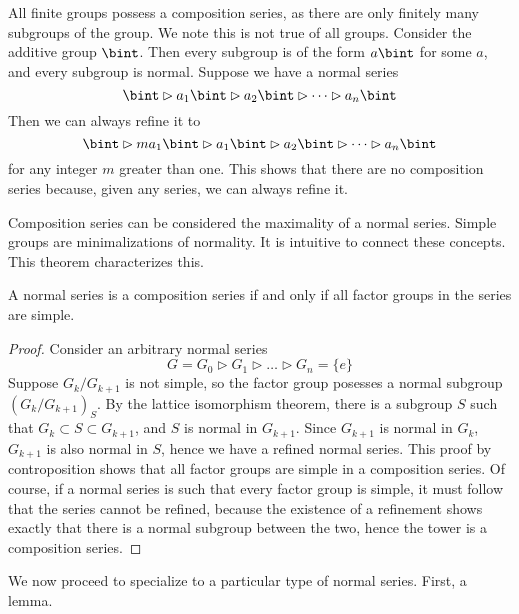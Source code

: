 All finite groups possess a composition series, as there are only finitely many subgroups of the group. We note this is not true of all groups. Consider the additive group $\bint$. Then every subgroup is of the form $a\bint$ for some $a$, and every subgroup is normal. Suppose we have a normal series
%
\[ \bint \rhd a_1\bint \rhd a_2\bint \rhd \dots \rhd a_n\bint \]
%
Then we can always refine it to
%
\[ \bint \rhd ma_1\bint \rhd a_1\bint \rhd a_2\bint \rhd \dots \rhd a_n\bint \]
%
for any integer $m$ greater than one. This shows that there are no composition series because, given any series, we can always refine it.

Composition series can be considered the maximality of a normal series. Simple groups are minimalizations of normality. It is intuitive to connect these concepts. This theorem characterizes this.

\begin{theorem}
    A normal series is a composition series if and only if all factor groups in the series are simple.
\end{theorem}
\begin{proof}
    Consider an arbitrary normal series
    \[ G = G_0 \rhd G_1 \rhd \dots \rhd G_n = \{ e \} \]
    Suppose $G_k/G_{k+1}$ is not simple, so the factor group posesses a normal subgroup $(G_k/G_{k+1})_S$. By the lattice isomorphism theorem, there is a subgroup $S$ such that $G_k \subset S \subset G_{k+1}$, and $S$ is normal in $G_{k+1}$. Since $G_{k+1}$ is normal in $G_k$, $G_{k+1}$ is also normal in $S$, hence we have a refined normal series. This proof by controposition shows that all factor groups are simple in a composition series. Of course, if a normal series is such that every factor group is simple, it must follow that the series cannot be refined, because the existence of a refinement shows exactly that there is a normal subgroup between the two, hence the tower is a composition series.
\end{proof}

We now proceed to specialize to a particular type of normal series. First, a lemma.

